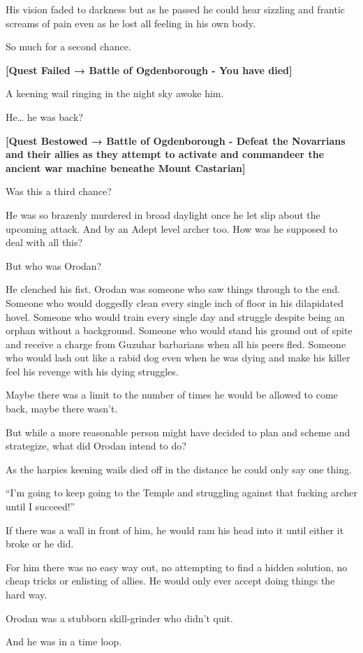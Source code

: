 \documentclass[a4paper,10pt]{book}
\begin{document}
His vision faded to darkness but as he passed he could hear sizzling and frantic screams of pain even as he lost all feeling in his own body.\par
So much for a second chance.\par
\textbf{[Quest Failed → Battle of Ogdenborough - You have died]}\par
\par
A keening wail ringing in the night sky awoke him.\par
He… he was back?\par
\textbf{[Quest Bestowed → Battle of Ogdenborough - Defeat the Novarrians and their allies as they attempt to activate and commandeer the ancient war machine beneathe Mount Castarian]}\par
Was this a third chance?\par
He was so brazenly murdered in broad daylight once he let slip about the upcoming attack. And by an Adept level archer too. How was he supposed to deal with all this?\par
But who was Orodan?\par
He clenched his fist. Orodan was someone who saw things through to the end. Someone who would doggedly clean every single inch of floor in his dilapidated hovel. Someone who would train every single day and struggle despite being an orphan without a background. Someone who would stand his ground out of spite and receive a charge from Guzuhar barbarians when all his peers fled. Someone who would lash out like a rabid dog even when he was dying and make his killer feel his revenge with his dying struggles.\par
Maybe there was a limit to the number of times he would be allowed to come back, maybe there wasn’t.\par
But while a more reasonable person might have decided to plan and scheme and strategize, what did Orodan intend to do?\par
As the harpies keening wails died off in the distance he could only say one thing.\par
“I’m going to keep going to the Temple and struggling against that fucking archer until I succeed!”\par
If there was a wall in front of him, he would ram his head into it until either it broke or he did.\par
For him there was no easy way out, no attempting to find a hidden solution, no cheap tricks or enlisting of allies. He would only ever accept doing things the hard way.\par
Orodan was a stubborn skill-grinder who didn’t quit.\par
And he was in a time loop.\par
\end{document}
